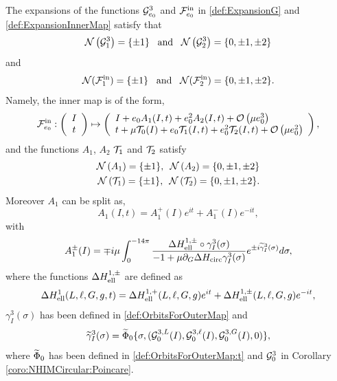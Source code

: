 \begin{lemma}\label{lemma:InnerMap:Elliptic}
The expansions of the functions $\mathcal{G}_{e_0}^3$ and  $\mathcal{F}^{\mathrm{in}}_{e_0}$ in \eqref{def:ExpansionG} and \eqref{def:ExpansionInnerMap} satisfy that
\[
 \mathcal{N}\left(\mathcal{G}_{1}^3\right)=\{\pm 1\}\,\,\,\text{ and }\,\,\,\mathcal{N}\left(\mathcal{G}_{2}^3\right)=\{0,\pm 1,\pm 2\}
\]
and
\[
 \mathcal{N}(\mathcal{F}^{\mathrm{in}}_1)=\{\pm 1\}\,\,\,\text{ and }\,\,\,\mathcal{N}(\mathcal{F}^{\mathrm{in}}_2)=\{0,\pm 1,\pm 2\}.
\]
Namely, the inner map is of the form,
  \begin{equation}\label{def:InnerMap:ell}
    \mathcal{F}_{e_0}^{\mathrm{in}}:\left(\begin{array}{c} I\\
        t
      \end{array}\right)\mapsto \left(\begin{array}{l} I+ e_0 A_1(I,t)+e_0^2 A_2(I,t)+\mathcal{O}\left(\mu e_0^3\right)\\
        t+\mu\mathcal{T}_0(I)+e_0 \mathcal{T}_1(I,t)+e_0^2 \mathcal{T}_2(I,t)+\mathcal{O}\left(\mu e_0^2\right)
      \end{array}\right),
  \end{equation}
  and the functions $A_1$, $A_2$ $\mathcal{T}_1$ and $\mathcal{T}_2$ satisfy
  \begin{align}
    \mathcal{N}\left(A_1\right)=\{\pm 1\},\,\,\, \mathcal{N}\left(A_2\right)=\{0,\pm 1,\pm 2\}\label{eq:InnerMap:I:1,2:Harmonics}\\
    \mathcal{N}\left(\mathcal{T}_1\right)=\{\pm 1\},\,\,\, \mathcal{N}\left(\mathcal{T}_2\right)=\{0,\pm 1,\pm 2\}\label{eq:InnerMap:t:1,2:Harmonics}.
  \end{align}
  Moreover $A_1$ can be split as,
  \[
  A_1(I,t)=A_1^+(I)e^{it}+A_1^-(I)e^{-it},
  \]
  with
  \begin{equation}\label{def:A:plus/minus}
    A_1^\pm(I)=\mp i\mu \int_0^{-14\pi}\frac{\Delta H_{\mathrm{ell}}^{1,\pm}\circ \gamma_I^3(\sigma)}{-1+\mu \partial_G\Delta H_{\mathrm{circ}}\gamma_I^3(\sigma)}e^{\pm i\widetilde\gamma_I^3(\sigma)}d\sigma,
  \end{equation}
  where the functions $\Delta H_{\mathrm{ell}}^{1,\pm}$ are defined as
  \[
  \Delta H_{\mathrm{ell}}^1(L,\ell,G,g,t)=\Delta H_{\mathrm{ell}}^{1,+}(L,\ell,G,g)e^{it}+\Delta H_{\mathrm{ell}}^{1,\pm}(L,\ell,G,g)e^{-it},
  \]
  $\gamma_I^3(\sigma)$ has been defined in \eqref{def:OrbitsForOuterMap} and
\begin{equation}\label{def:Orbit:Gamma3:time}
 \widetilde\gamma_I^3(\sigma)=
\widetilde\Phi_0\{\sigma,(\mathcal{G}_0^{3,L}(I),\mathcal{G}_0^{3,\ell}(I),\mathcal{G}_0^{3,G}(I),0)\},
\end{equation}
where $\widetilde\Phi_0$ has been defined in \eqref{def:OrbitsForOuterMap:t} and $\mathcal{G}^3_0$ in Corollary \ref{coro:NHIMCircular:Poincare}.
\end{lemma}
